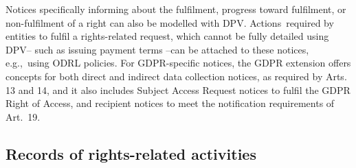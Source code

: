 \documentclass{IOS-Book-Article}     %
\begin{document}
Notices specifically informing about the fulfilment, progress toward fulfilment, or non-fulfilment of a right can also be modelled with DPV.
Actions~required by entities to fulfil a rights-related request, which cannot be fully detailed using DPV-- such as issuing payment terms --can be attached to these notices, e.g.,~using ODRL policies.
For GDPR-specific notices, the GDPR extension offers concepts for both direct and indirect data collection notices, as required by Arts. 13 and 14, and it also includes Subject Access Request notices to fulfil the GDPR Right of Access, and recipient notices to meet the notification requirements of Art.~19.



\subsection{Records of rights-related activities}
\label{sec:records}
\end{document}
